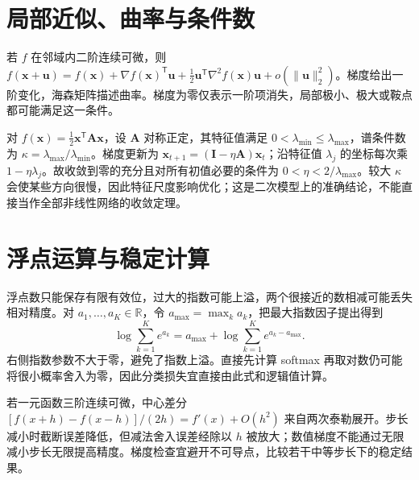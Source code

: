 \section{局部近似、曲率与条件数}
若 $f$ 在邻域内二阶连续可微，则 $f(\mathbf x+\mathbf u)=f(\mathbf x)+\nabla f(\mathbf x)^\mathsf T\mathbf u+\frac12\mathbf u^\mathsf T\nabla^2f(\mathbf x)\mathbf u+o(\|\mathbf u\|_2^2)$。梯度给出一阶变化，海森矩阵描述曲率。梯度为零仅表示一阶项消失，局部极小、极大或鞍点都可能满足这一条件。

对 $f(\mathbf x)=\frac12\mathbf x^\mathsf T\mathbf A\mathbf x$，设 $\mathbf A$ 对称正定，其特征值满足 $0<\lambda_{\min}\leq\lambda_{\max}$，谱条件数为 $\kappa=\lambda_{\max}/\lambda_{\min}$。梯度更新为 $\mathbf x_{t+1}=(\mathbf I-\eta\mathbf A)\mathbf x_t$；沿特征值 $\lambda_j$ 的坐标每次乘 $1-\eta\lambda_j$。故收敛到零的充分且对所有初值必要的条件为 $0<\eta<2/\lambda_{\max}$。较大 $\kappa$ 会使某些方向很慢，因此特征尺度影响优化；这是二次模型上的准确结论，不能直接当作全部非线性网络的收敛定理。

\section{浮点运算与稳定计算}
浮点数只能保存有限有效位，过大的指数可能上溢，两个很接近的数相减可能丢失相对精度。对 $a_1,\ldots,a_K\in\mathbb R$，令 $a_{\max}=\max_ka_k$，把最大指数因子提出得到
\begin{equation}
\log\sum_{k=1}^Ke^{a_k}=a_{\max}+\log\sum_{k=1}^Ke^{a_k-a_{\max}}.
\label{eq:dl-logsumexp}
\end{equation}
右侧指数参数不大于零，避免了指数上溢。直接先计算 softmax 再取对数仍可能将很小概率舍入为零，因此分类损失宜直接由此式和逻辑值计算。

若一元函数三阶连续可微，中心差分 $[f(x+h)-f(x-h)]/(2h)=f'(x)+O(h^2)$ 来自两次泰勒展开。步长减小时截断误差降低，但减法舍入误差经除以 $h$ 被放大；数值梯度不能通过无限减小步长无限提高精度。梯度检查宜避开不可导点，比较若干中等步长下的稳定结果。

